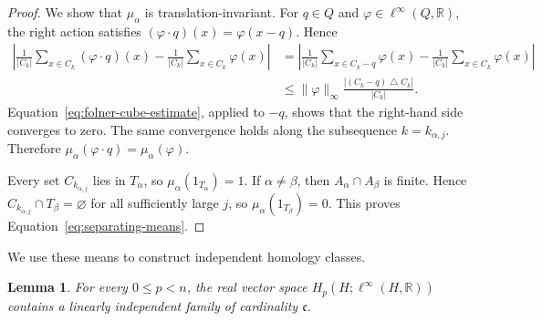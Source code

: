 \documentclass[pdflatex,sn-mathphys-num]{sn-jnl}%
\theoremstyle{plain}
\newtheorem{lemma}[theorem]{Lemma}
\theoremstyle{remark}
\theoremstyle{definition}
\numberwithin{equation}{section}
\begin{document}
\begin{proof}
We show that \( \mu_\alpha \) is translation-invariant. For \( q\in Q \) and \( \varphi\in\ell^\infty(Q,\mathbb R) \), the right action satisfies \( (\varphi\cdot q)(x)=\varphi(x-q) \). Hence
\[
\begin{aligned}
\left|
\frac{1}{|C_k|}
\sum_{x\in C_k}
(\varphi\cdot q)(x)
-
\frac{1}{|C_k|}
\sum_{x\in C_k}
\varphi(x)
\right|
&=
\left|
\frac{1}{|C_k|}
\sum_{x\in C_k-q}
\varphi(x)
-
\frac{1}{|C_k|}
\sum_{x\in C_k}
\varphi(x)
\right|\\
&\leq
\|\varphi\|_\infty
\frac{|(C_k-q)\mathbin{\triangle}C_k|}{|C_k|}.
\end{aligned}
\]
Equation~\eqref{eq:folner-cube-estimate}, applied to \( -q \), shows that the right-hand side converges to zero. The same convergence holds along the subsequence \( k=k_{\alpha,j} \). Therefore \( \mu_\alpha(\varphi\cdot q)=\mu_\alpha(\varphi) \).

Every set \( C_{k_{\alpha,j}} \) lies in \( T_\alpha \), so \( \mu_\alpha(1_{T_\alpha})=1 \). If \( \alpha\neq\beta \), then \( A_\alpha\cap A_\beta \) is finite. Hence \( C_{k_{\alpha,j}}\cap T_\beta=\varnothing \) for all sufficiently large \( j \), so \( \mu_\alpha(1_{T_\beta})=0 \). This proves Equation~\eqref{eq:separating-means}.
\end{proof}

We use these means to construct independent homology classes.

\begin{lemma}
\label{lem:independent-lower-koszul-classes}
For every \( 0\leq p<n \), the real vector space \( H_p(H;\ell^\infty(H,\mathbb R)) \) contains a linearly independent family of cardinality \( \mathfrak c \).
\end{lemma}
\end{document}
